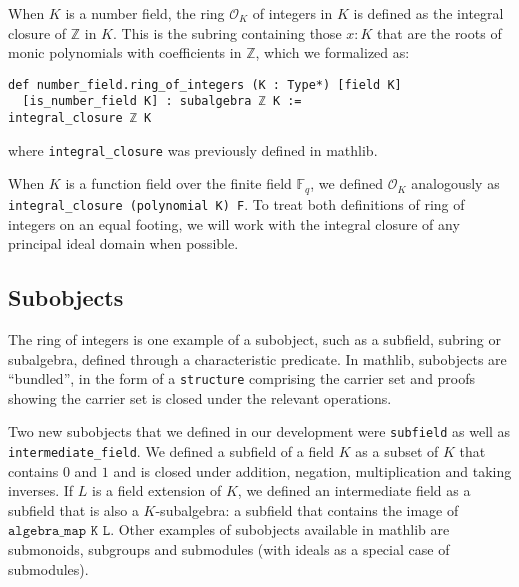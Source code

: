 \documentclass[a4paper,USenglish,cleveref, autoref, thm-restate]{lipics-v2021}
\newcommand{\lean}[1]{\texttt{#1}\xspace} %
\newcommand*{\OK}[1][K]{\mathcal{O}_{#1}}
\newcommand*{\Fq}[1][q]{\mathbb{F}_{#1}}
\newcommand{\mathlib}{\textsf{mathlib}\xspace}
\newcommand{\Q}{\mathbb{Q}}
\newcommand{\Z}{\mathbb{Z}}
\begin{document}
When $K$ is a number field, the ring $\OK$ of integers in $K$ is defined as the integral closure of $\Z$ in $K$.
This is the subring containing those $x : K$ that are the roots of monic polynomials with coefficients in $\Z$, which we formalized as:
\begin{lstlisting}
def number_field.ring_of_integers (K : Type*) [field K]
  [is_number_field K] : subalgebra ℤ K :=
integral_closure ℤ K
\end{lstlisting}
where \lean{integral\_closure} was previously defined in \mathlib.

When $K$ is a function field over the finite field $\Fq$, we defined $\OK$ analogously as \lean{integral\_closure (polynomial K) F}.
To treat both definitions of ring of integers on an equal footing,
we will work with the integral closure of any principal ideal domain when possible.

\subsection{Subobjects} \label{sec:subobjects}

The ring of integers is one example of a subobject, such as a subfield, subring or subalgebra, defined through a characteristic predicate.
In \mathlib, subobjects are ``bundled'', in the form of a \lean{structure} comprising the carrier set and proofs showing the carrier set is closed under the relevant operations.

Two new subobjects that we defined in our development were \lean{subfield} as well as \lean{intermediate\_field}. We defined a subfield of a field $K$ as a subset of $K$ that contains $0$ and $1$ and is closed under addition, negation, multiplication and taking inverses.
If $L$ is a field extension of $K$, we defined an intermediate field as a subfield that is also a $K$-subalgebra: a subfield that contains the image of $\lean{algebra\_map K L}$.
Other examples of subobjects available in \mathlib are submonoids, subgroups and submodules (with ideals as a special case of submodules).
\end{document}
